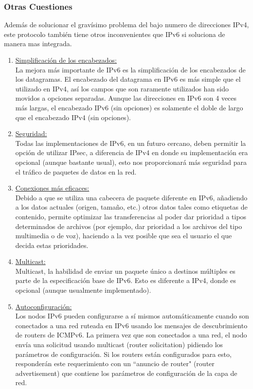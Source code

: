 \documentclass[11pt,a4paper]{article}
\begin{document}
\subsubsection{Otras Cuestiones}
Además de solucionar el gravísimo problema del bajo numero de direcciones IPv4, este protocolo 
también tiene otros inconvenientes que IPv6 si soluciona de manera mas integrada.
\begin{enumerate}

\item \underline{Simplificación de los encabezados:}\\
La mejora más importante de IPv6 es la simplificación de los encabezados de los datagramas. El 
encabezado del datagrama en IPv6 es más simple que el utilizado en IPv4, así los campos que son 
raramente utilizados han sido movidos a opciones separadas. Aunque las direcciones en IPv6 son 4 
veces más largas, el encabezado IPv6 (sin opciones) es solamente el doble de largo que el encabezado 
IPv4 (sin opciones).

\item  \underline{Seguridad:}\\
Todas las implementaciones de IPv6, en un futuro cercano, deben permitir la opción de utilizar 
IPsec, a diferencia de IPv4 en donde su implementación era opcional (aunque bastante usual), esto 
nos proporcionará más seguridad para el tráfico de paquetes de datos en la red.

\item  \underline{Conexiones más eficaces:}\\
Debido a que se utiliza una cabecera de paquete diferente en IPv6, añadiendo a los datos actuales 
(origen, tamaño, etc.) otros datos tales como etiquetas de contenido, permite optimizar las 
transferencias al poder dar prioridad a tipos determinados de archivos (por ejemplo, dar prioridad a 
los archivos del tipo multimedia o de voz), haciendo a la vez posible que sea el usuario el que 
decida estas prioridades.

\item  \underline{Multicast:}\\
Multicast, la habilidad de enviar un paquete único a destinos múltiples es parte de la 
especificación base de IPv6. Esto es diferente a IPv4, donde es opcional (aunque usualmente 
implementado).

\item  \underline{Autoconfiguración:}\\
Los nodos IPv6 pueden configurarse a sí mismos automáticamente cuando son conectados a una red 
ruteada en IPv6 usando los mensajes de descubrimiento de routers de ICMPv6. La primera vez que son 
conectados a una red, el nodo envía una solicitud usando multicast (router solicitation) pidiendo 
los parámetros de configuración. Si los routers están configurados para esto, responderán este 
requerimiento con un ``anuncio de router" (router advertisement) que contiene los parámetros de 
configuración de la capa de red.


\end{enumerate}
\end{document}
